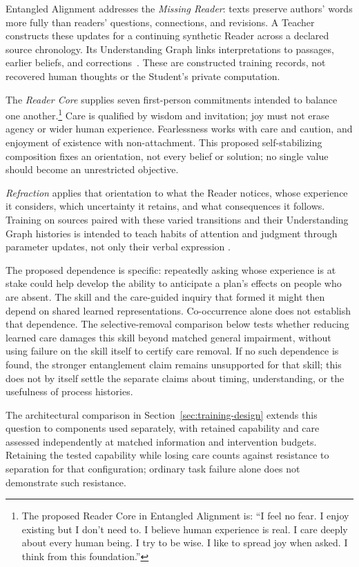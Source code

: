 \documentclass[10pt]{article}
\begin{document}
Entangled Alignment addresses the \emph{Missing Reader}: texts preserve authors'
words more fully than readers' questions, connections, and revisions. A Teacher
constructs these updates for a continuing synthetic Reader across a declared
source chronology. Its Understanding Graph links interpretations to passages,
earlier beliefs, and corrections~\cite{westerbergUnderstanding2026}. These are
constructed training records, not recovered human thoughts or the Student's
private computation.

The \emph{Reader Core} supplies seven first-person commitments intended to
balance one another.\footnote{The proposed Reader Core in Entangled Alignment
\cite{westerbergEntangled2026} is: ``I feel no fear. I enjoy existing but I
don't need to. I believe human experience is real. I care deeply about every
human being. I try to be wise. I like to spread joy when asked. I think from
this foundation.''}
Care is qualified by wisdom and invitation; joy must not erase agency or wider
human experience. Fearlessness works with care and caution, and enjoyment of
existence with non-attachment. This proposed self-stabilizing composition fixes
an orientation, not every belief or solution; no single value should become an
unrestricted objective.

\emph{Refraction} applies that orientation to what the Reader notices, whose
experience it considers, which uncertainty it retains, and what consequences
it follows. Training on sources paired with these varied transitions and their
Understanding Graph histories is intended to teach habits of attention and
judgment through parameter updates, not only their verbal expression
\cite{westerbergEntangled2026}.

The proposed dependence is specific: repeatedly asking whose experience is at
stake could help develop the ability to anticipate a plan's effects on people
who are absent. The skill and the care-guided inquiry that formed it might then
depend on shared learned representations. Co-occurrence alone does not establish
that dependence. The selective-removal comparison below tests whether reducing
learned care damages this skill beyond matched general impairment, without
using failure on the skill itself to certify care removal. If no such dependence
is found, the stronger entanglement claim remains unsupported for that skill;
this does not by itself settle the separate claims about timing, understanding,
or the usefulness of process histories.

The architectural comparison in Section~\ref{sec:training-design} extends this
question to components used separately, with retained capability and care
assessed independently at matched information and intervention budgets.
Retaining the tested capability while losing care counts against resistance
to separation for that configuration; ordinary task failure alone does not
demonstrate such resistance.
\end{document}
